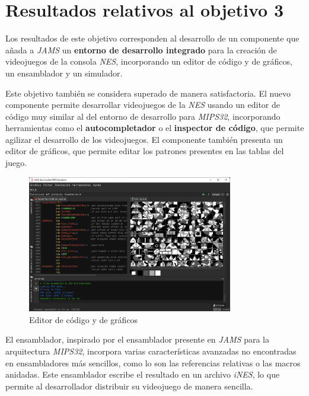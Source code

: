 \section{Resultados relativos al objetivo 3}\label{sec:resultados-relativos-al-objetivo-3}

Los resultados de este objetivo corresponden al desarrollo
de un componente que añada a \textit{JAMS} un \textbf{entorno de
desarrollo integrado} para la creación de videojuegos de la
consola \textit{NES}, incorporando un editor de código
y de gráficos, un ensamblador y un simulador.

Este objetivo también se considera superado de manera satisfactoria.
El nuevo componente permite desarrollar videojuegos de
la \textit{NES} usando un editor de código muy similar al del
entorno de desarrollo para \textit{MIPS32}, incorporando
herramientas como el \textbf{autocompletador} o el \textbf{inspector de código},
que permite agilizar el desarrollo de los videojuegos.
El componente también presenta un editor de gráficos, que permite
editar los patrones presentes en las tablas del juego.

\begin{figure}[h]
    \centering
    \includegraphics[width=0.8\textwidth]{images/results/nes-editor}
    \caption{Editor de código y de gráficos}
    \label{fig:nes-result-editor}
\end{figure}

El ensamblador, inspirado por el ensamblador presente
en \textit{JAMS} para la arquitectura \textit{MIPS32},
incorpora varias características avanzadas no encontradas
en ensambladores más sencillos, como lo son las referencias
relativas o las macros anidadas.
Este ensamblador escribe el resultado en un archivo \textit{iNES},
lo que permite al desarrollador distribuir su videojuego de manera
sencilla.

